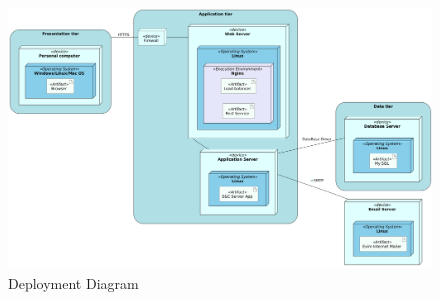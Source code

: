 \begin{figure}[H]
    \centering
    \includegraphics[width=\textwidth]{../images/Deployment_diagram.png}
    \caption{Deployment Diagram}
    \label{fig:Deployment Diagram}
\end{figure}

